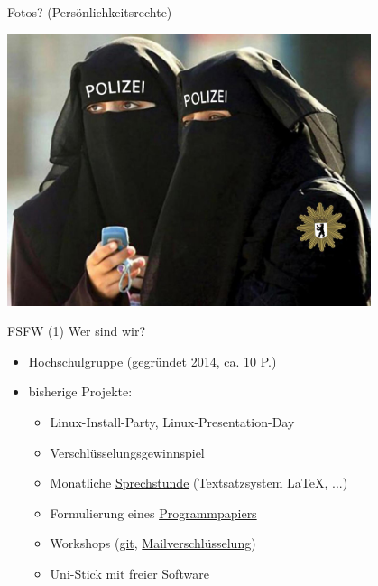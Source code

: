 \documentclass[t]{beamer}
\begin{document}
\begin{frame}[label=photo,plain]{\color{fg}Fotos? (Persönlichkeitsrechte)}
\vspace{10mm}
\begin{center}
\includegraphics[width=0.8\textwidth]{img-src/annonymitaet}
 
\end{center}
 
\end{frame}



\begin{frame}[label=ct1]{\color{fg}FSFW (1)}
Wer sind wir?
  \begin{itemize}
  \item Hochschulgruppe (gegründet 2014, ca. 10 P.)
  \item bisherige Projekte:
  \begin{itemize}
   \item Linux-Install-Party, Linux-Presentation-Day
   \item Verschlüsselungsgewinnspiel
   \item Monatliche \href{https://fsfw-dresden.de/sprechstunde}{Sprechstunde} (Textsatzsystem \LaTeX, ...)
   \item Formulierung eines \href{https://fsfw-dresden.de/programm}{Programmpapiers}
   \item Workshops (\href{https://fsfw-dresden.de/git-ws}{git}, \href{https://fsfw-dresden.de/gpg}{Mailverschlüsselung})
   \item Uni-Stick mit freier Software
  \end{itemize}
  \end{itemize}  
\end{frame}
\end{document}

